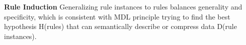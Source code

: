 





%
\noindent
\textbf{Rule Induction}
Generalizing rule instances to rules balances generality and specificity, which is consistent with MDL principle trying to find the best hypothesis H(rules) that can semantically describe or compress data D(rule instances).
 
